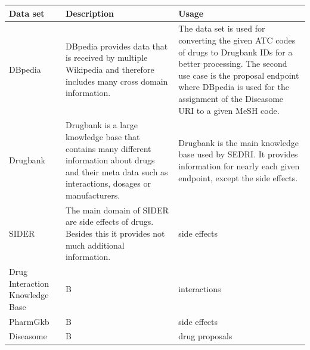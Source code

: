 \begin{tabular}{p{}|p{}|p{}}
  Data set & Description & Usage\\
  \hline
  DBpedia & DBpedia provides data that is received by multiple Wikipedia and therefore includes many cross domain information. & The data set is used for converting the given ATC codes of drugs to Drugbank IDs for a better processing. The second use case is the proposal endpoint where DBpedia is used for the assignment of the Diseasome URI to a given MeSH code. \\
  Drugbank & Drugbank is a large knowledge base that contains many different information about drugs and their meta data such as interactions, dosages or manufacturers. & Drugbank is the main knowledge base used by SEDRI. It provides information for nearly each given endpoint, except the side effects.\\
  SIDER & The main domain of SIDER are side effects of drugs. Besides this it provides not much additional information. & side effects\\
  Drug Interaction Knowledge Base & B & interactions \\
  PharmGkb & B & side effects\\
  Diseasome & B & drug proposals
\end{tabular}

